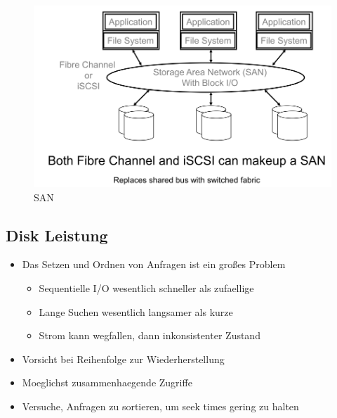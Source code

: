 \documentclass[a4paper]{scrreprt}
\begin{document}
\begin{figure}[ht]
\centering
\includegraphics[scale=0.4]{graphics/san.png}
\caption{SAN}
\end{figure}

\subsection{Disk Leistung}
\begin{itemize}
	\item Das Setzen und Ordnen von Anfragen ist ein großes Problem
		\begin{itemize}
			\item Sequentielle I/O wesentlich schneller als zufaellige
			\item Lange Suchen wesentlich langsamer als kurze
			\item Strom kann wegfallen, dann inkonsistenter Zustand
		\end{itemize}
	\item Vorsicht bei Reihenfolge zur Wiederherstellung
	\item Moeglichst zusammenhaegende Zugriffe
	\item Versuche, Anfragen zu sortieren, um seek times gering zu halten
\end{itemize}
\end{document}
